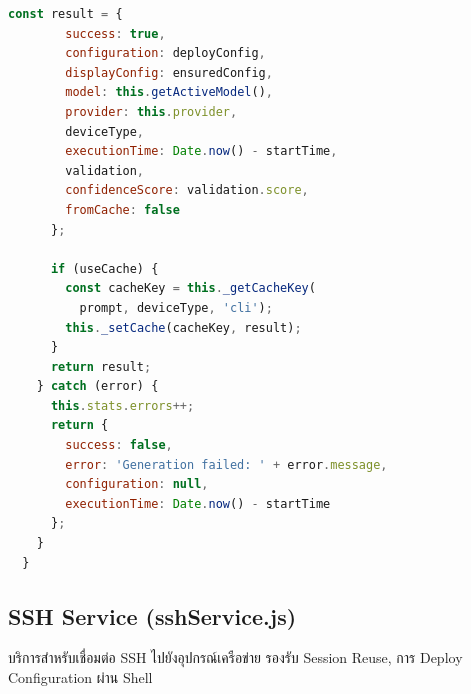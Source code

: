\begin{lstlisting}[language=JavaScript, caption={llmService.js -- generateConfiguration}]
      const result = {
        success: true,
        configuration: deployConfig,
        displayConfig: ensuredConfig,
        model: this.getActiveModel(),
        provider: this.provider,
        deviceType,
        executionTime: Date.now() - startTime,
        validation,
        confidenceScore: validation.score,
        fromCache: false
      };

      if (useCache) {
        const cacheKey = this._getCacheKey(
          prompt, deviceType, 'cli');
        this._setCache(cacheKey, result);
      }
      return result;
    } catch (error) {
      this.stats.errors++;
      return {
        success: false,
        error: 'Generation failed: ' + error.message,
        configuration: null,
        executionTime: Date.now() - startTime
      };
    }
  }
\end{lstlisting}

\subsection{SSH Service (sshService.js)}
\hspace*{1.3em}
บริการสำหรับเชื่อมต่อ SSH ไปยังอุปกรณ์เครือข่าย รองรับ Session Reuse, การ Deploy Configuration ผ่าน Shell

